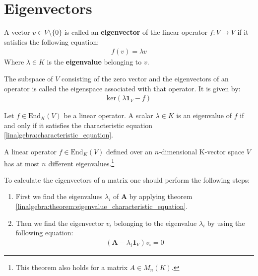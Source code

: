 \section{Eigenvectors}
	
	\begin{definition}[Eigenvector]
		A vector $v\in V\setminus\{0\}$ is called an \textbf{eigenvector} of the linear operator $f: V\rightarrow V$ if it satisfies the following equation:
        	\begin{gather}
			f(v) = \lambda v
		\end{gather}
        	Where $\lambda \in K$ is the \textbf{eigenvalue} belonging to $v$.
	\end{definition}
	\begin{definition}[Eigenspace]
		The subspace of $V$ consisting of the zero vector and the eigenvectors of an operator is called the eigenspace associated with that operator. It is given by:
        	\begin{gather}
			\text{ker}(\lambda\boldsymbol{1}_V - f)
		\end{gather}
	\end{definition}

	\begin{theorem}\label{linalgebra:theorem:eigenvalue_characteristic_equation}
	    	Let $f\in\text{End}_K(V)$ be a linear operator. A scalar $\lambda\in K$ is an eigenvalue of $f$ if and only if it satisfies the characteristic equation \ref{linalgebra:characteristic_equation}.
	\end{theorem}
    
	\begin{theorem}
		A linear operator $f\in\text{End}_K(V)$ defined over an $n$-dimensional K-vector space $V$ has at most $n$ different eigenvalues.\footnote{This theorem also holds for a matrix $A\in M_n(K)$.}
	\end{theorem}
    
	\begin{method}
		To calculate the eigenvectors of a matrix one should perform the following steps:
		\begin{enumerate}
			\item First we find the eigenvalues $\lambda_i$ of $\mathbf{A}$ by applying theorem \ref{linalgebra:theorem:eigenvalue_characteristic_equation}.
		        \item Then we find the eigenvector $v_i$ belonging to the eigenvalue $\lambda_i$ by using the following equation:
			        \begin{gather}
					\label{linalgebra:eigenvectors:eigenspace}
                			\left(\mathbf{A} - \lambda_i\mathbf{1}_V\right)v_i = 0
				\end{gather}
		\end{enumerate}
	\end{method}
    

